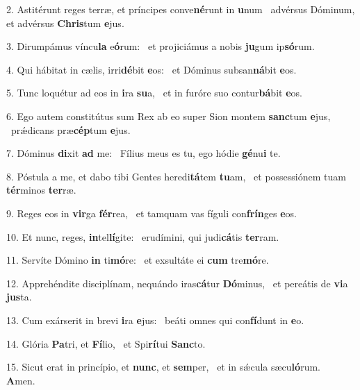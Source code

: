 2. Astitérunt reges terræ, et príncipes conve\textbf{né}runt in \textbf{u}num \ast\  advérsus Dóminum, et advérsus \textbf{Chris}tum \textbf{e}jus.\

3. Dirumpámus víncu\textbf{la} e\textbf{ó}rum: \ast\  et projiciámus a nobis \textbf{ju}gum ip\textbf{só}rum.\

4. Qui hábitat in cælis, irri\textbf{dé}bit \textbf{e}os: \ast\  et Dóminus subsan\textbf{ná}bit \textbf{e}os.\

5. Tunc loquétur ad eos in \textbf{i}ra \textbf{su}a, \ast\  et in furóre suo contur\textbf{bá}bit \textbf{e}os.\

6. Ego autem constitútus sum Rex ab eo super Sion montem \textbf{sanc}tum \textbf{e}jus, \ast\  prǽdicans præ\textbf{cép}tum \textbf{e}jus.\

7. Dóminus \textbf{di}xit \textbf{ad} me: \ast\  Fílius meus es tu, ego hódie \textbf{gé}nu\textbf{i} te.\

8. Póstula a me, et dabo tibi Gentes heredi\textbf{tá}tem \textbf{tu}am, \ast\  et possessiónem tuam \textbf{tér}minos \textbf{ter}ræ.\

9. Reges eos in \textbf{vir}ga \textbf{fér}rea, \ast\  et tamquam vas fíguli con\textbf{frín}ges \textbf{e}os.\

10. Et nunc, reges, \textbf{in}tel\textbf{lí}gite: \ast\  erudímini, qui judi\textbf{cá}tis \textbf{ter}ram.\

11. Servíte Dómino \textbf{in} ti\textbf{mó}re: \ast\  et exsultáte ei \textbf{cum} tre\textbf{mó}re.\

12. Apprehéndite disciplínam, nequándo iras\textbf{cá}tur \textbf{Dó}minus, \ast\  et pereátis de \textbf{vi}a \textbf{jus}ta.\

13. Cum exárserit in brevi \textbf{i}ra \textbf{e}jus: \ast\  beáti omnes qui con\textbf{fí}dunt in \textbf{e}o.\

14. Glória \textbf{Pa}tri, et \textbf{Fí}lio, \ast\  et Spi\textbf{rí}tui \textbf{Sanc}to.\

15. Sicut erat in princípio, et \textbf{nunc}, et \textbf{sem}per, \ast\  et in sǽcula sæcu\textbf{ló}rum. \textbf{A}men.\

